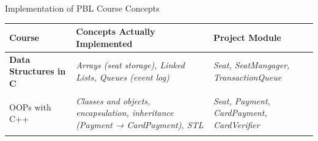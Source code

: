 \documentclass[aspectratio=169,11pt]{beamer}
\newcommand{\smallnote}[1]{%
\vspace{0.08cm}
{\scriptsize\color{GEUGrey}#1}
}
\newcommand{\placeholder}[1]{%
\textit{\color{GEUGrey}#1}
}
\begin{document}
\begin{frame}{Implementation of PBL Course Concepts}

\scriptsize

\begin{center}

\renewcommand{\arraystretch}{1.25}

\begin{tabularx}{.96\textwidth}
{@{}>{\bfseries}p{3.0cm}X p{2.5cm}@{}}

\toprule
Course & Concepts Actually Implemented & Project Module\\
\midrule

Data Structures in C &
\placeholder{Arrays (seat storage), Linked Lists, Queues (event log)} &
\placeholder{Seat, SeatMangager, TransactionQueue}\\

\midrule

OOPs with C++ &
\placeholder{Classes and objects, encapsulation, inheritance (Payment → CardPayment), STL} &
\placeholder{Seat, Payment, CardPayment, CardVerifier}\\




\bottomrule

\end{tabularx}

\end{center}

\vfill



\end{frame}
\end{document}
